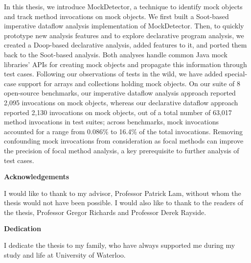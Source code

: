 In this thesis, we introduce MockDetector, a technique to identify mock objects and track method invocations on mock objects. We first built a Soot-based imperative dataflow analysis implementation of MockDetector. Then, to quickly prototype new analysis features and to explore declarative program analysis, we created a Doop-based declarative analysis, added features to it, and ported them back to the Soot-based analysis. Both analyses handle common Java mock libraries' APIs for creating mock objects and propagate this information through test cases. Following our observations of tests in the wild, we have added special-case support for arrays and collections holding mock objects. On our suite of 8 open-source benchmarks, our imperative dataflow analysis approach reported 2,095 invocations on mock objects, whereas our declarative dataflow approach reported 2,130 invocations on mock objects, out of a total number of 63,017 method invocations in test suites; across benchmarks, mock invocations accounted for a range from 0.086\% to 16.4\% of the total invocations. Removing confounding mock invocations from consideration as focal methods can improve the precision of focal method analysis, a key prerequisite to further analysis of test cases. %


\cleardoublepage


\begin{center}\textbf{Acknowledgements}\end{center}

I would like to thank to my advisor, Professor Patrick Lam, without whom the thesis
would not have been possible. I would also like to thank to the readers of the thesis,
Professor Gregor Richards and Professor Derek Rayside.
\cleardoublepage


\begin{center}\textbf{Dedication}\end{center}

I dedicate the thesis to my family, who have always supported me during my study and life at University of Waterloo.
\cleardoublepage

\renewcommand\contentsname{Table of Contents}
\tableofcontents
\cleardoublepage
{}    %

